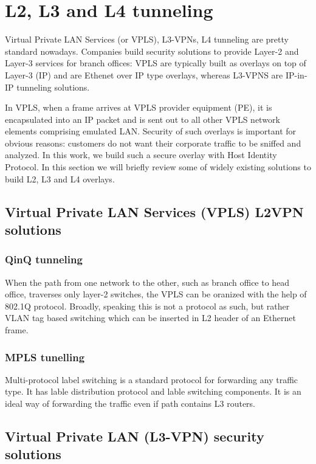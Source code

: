 \section{L2, L3 and L4 tunneling}

Virtual Private LAN Services (or VPLS), L3-VPNs, L4 tunneling are pretty standard nowadays. 
Companies build security solutions to provide Layer-2 and Layer-3 services for branch offices: 
VPLS are typically built as overlays on top of Layer-3 (IP) and are Ethenet over IP type 
overlays, whereas L3-VPNS are IP-in-IP tunneling solutions.

In VPLS, when a frame arrives at VPLS provider equipment (PE), it is encapsulated 
into an IP packet and is sent out to all other VPLS network elements comprising emulated LAN. 
Security of such overlays is important for obvious reasons: customers do not want their corporate 
traffic to be sniffed and analyzed. In this work, we build such a secure overlay with Host Identity 
Protocol. In this section we will briefly review some of widely existing solutions to build L2, L3 and L4
overlays.

\subsection{Virtual Private LAN Services (VPLS) L2VPN solutions}

\subsubsection{QinQ tunneling}

When the path from one network to the other, such as branch office to head office,
traverses only layer-2 switches, the VPLS can be oranized with the help of 
802.1Q protocol. Broadly, speaking this is not a protocol as such, but rather 
VLAN tag based switching which can be inserted in L2 header of an Ethernet frame. 

\subsubsection{MPLS tunelling}

Multi-protocol label switching is a standard protocol for forwarding any traffic type.
It has lable distribution protocol and lable switching components. It is an ideal way 
of forwarding the traffic even if path contains L3 routers.

\subsection{Virtual Private LAN (L3-VPN) security solutions}

